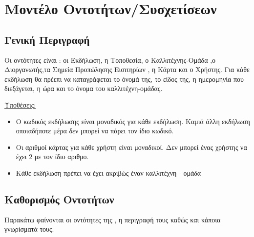 ﻿\section{Μοντέλο Οντοτήτων/Συσχετίσεων}

\subsection{Γενική Περιγραφή}

Οι οντότητες είναι : οι Εκδήλωση, η Τοποθεσία, ο Καλλιτέχνης-Ομάδα ,ο
Διοργανωτής,τα Σημεία Προπώλησης Εισιτηρίων , η Κάρτα και ο
Χρήστης. Για κάθε εκδήλωση θα πρέεπι να καταγράφεται το όνομά της, το
είδος της, η ημερομηνία που διεξάγεται, η ώρα και το όνομα του
καλλιτέχνη-ομάδας.

\underline{Υποθέσεις:}
\begin{itemize}[noitemsep]
\item Ο κωδικός εκδήλωσης είναι μοναδικός για κάθε εκδήλωση. Καμιά άλλη εκδήλωση
οποιαδήποτε μέρα δεν μπορεί να πάρει τον ίδιο κωδικό.
\item Οι αριθμοί κάρτας για κάθε χρήστη είναι μοναδικοί. Δεν μπορεί
  ένας χρήστης να έχει 2 με τον ίδιο αριθμο.
\item Κάθε εκδήλωση πρέπει να έχει ακριβώς έναν καλλιτέχνη - ομάδα 
  \end{itemize}

\subsection{Καθορισμός Οντοτήτων}

Παρακάτω φαίνονται οι οντότητες της \titlos, η περιγραφή τους καθώς
και κάποια γνωρίσματά τους.

